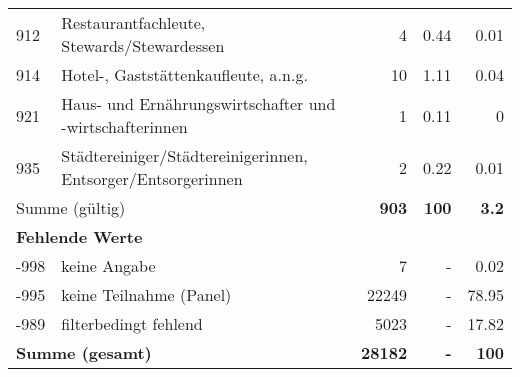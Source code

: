\begin{longtable}{lXrrr}
        912 & \multicolumn{1}{X}{Restaurantfachleute, Stewards/Stewardessen} & %
          \num{4} &
          \num[round-mode=places,round-precision=2]{0,44} &
          \num[round-mode=places,round-precision=2]{0,01} \\

        914 & \multicolumn{1}{X}{Hotel-, Gaststättenkaufleute, a.n.g.} & %
          \num{10} &
          \num[round-mode=places,round-precision=2]{1,11} &
          \num[round-mode=places,round-precision=2]{0,04} \\

        921 & \multicolumn{1}{X}{Haus- und Ernährungswirtschafter und -wirtschafterinnen} & %
          \num{1} &
          \num[round-mode=places,round-precision=2]{0,11} &
          \num[round-mode=places,round-precision=2]{0} \\

        935 & \multicolumn{1}{X}{Städtereiniger/Städtereinigerinnen, Entsorger/Entsorgerinnen} & %
          \num{2} &
          \num[round-mode=places,round-precision=2]{0,22} &
          \num[round-mode=places,round-precision=2]{0,01} \\

     \midrule
     \multicolumn{2}{l}{Summe (gültig)} &
       \textbf{\num{903}} &
     \textbf{100} &
       \textbf{\num[round-mode=places,round-precision=2]{3,2}} \\
     \multicolumn{5}{l}{\textbf{Fehlende Werte}}\\
       -998 &
       keine Angabe &
         \num{7} &
        - &
         \num[round-mode=places,round-precision=2]{0,02} \\
       -995 &
       keine Teilnahme (Panel) &
         \num{22249} &
        - &
         \num[round-mode=places,round-precision=2]{78,95} \\
       -989 &
       filterbedingt fehlend &
         \num{5023} &
        - &
         \num[round-mode=places,round-precision=2]{17,82} \\
     \midrule
     \multicolumn{2}{l}{\textbf{Summe (gesamt)}} &
          \textbf{\num{28182}} &
        \textbf{-} &
        \textbf{100} \\
     \bottomrule
     \end{longtable}
     
